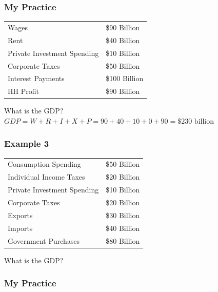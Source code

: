 \documentclass[
  letterpaper,
  DIV=11,
  numbers=noendperiod]{scrartcl}
\begin{document}
\subsubsection{My Practice}\label{my-practice-1}

\begin{longtable}[]{@{}
  >{\raggedright\arraybackslash}p{}
  >{\raggedright\arraybackslash}p{}@{}}
\toprule\noalign{}
\endhead
\bottomrule\noalign{}
\endlastfoot
Wages & \$90 Billion \\
Rent & \$40 Billion \\
Private Investment Spending & \$10 Billion \\
Corporate Taxes & \$50 Billion \\
Interest Payments & \$100 Billion \\
HH Profit & \$90 Billion \\
\end{longtable}

What is the GDP?
\(GDP = W + R + I + X + P = 90 + 40 + 10 + 0 + 90 = \$230 \text{ billion}\)

\subsubsection{Example 3}\label{example-3}

\begin{longtable}[]{@{}
  >{\raggedright\arraybackslash}p{}
  >{\raggedright\arraybackslash}p{}@{}}
\toprule\noalign{}
\endhead
\bottomrule\noalign{}
\endlastfoot
Consumption Spending & \$50 Billion \\
Individual Income Taxes & \$20 Billion \\
Private Investment Spending & \$10 Billion \\
Corporate Taxes & \$20 Billion \\
Exports & \$30 Billion \\
Imports & \$40 Billion \\
Government Purchases & \$80 Billion \\
\end{longtable}

What is the GDP?

\subsubsection{My Practice}\label{my-practice-2}
\end{document}

